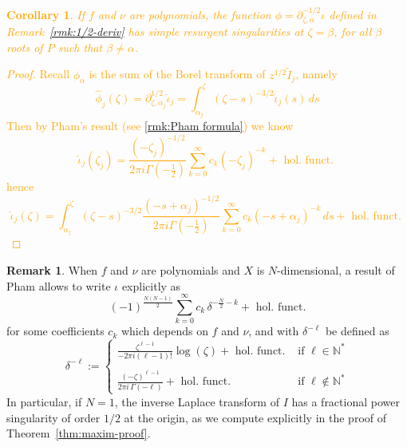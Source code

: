 \documentclass{article}
\newcommand{\fracderiv}[3]{\partial^{#1}_{#2, #3}}
\theoremstyle{definition}
\newtheorem{remark}[definition]{Remark}
\theoremstyle{plain}
\newtheorem{corollary}[theorem]{Corollary}
\begin{document}
\textcolor{orange}{
\begin{corollary}\label{simple-res-thimble}
    If $f$ and $\nu$ are polynomials, the function ${\phi}=\fracderiv{-1/2}{\zeta}{\alpha}\iota$ defined in Remark~\ref{rmk:1/2-deriv} has simple resurgent singularities at $\zeta=\beta$, for all $\beta$ roots of $P$ such that $\beta\neq\alpha$.  
\end{corollary}
\begin{proof}
    Recall ${\phi}_\alpha$ is the sum of the Borel transform of $z^{1/2}\tilde{I}_j$, namely 
    \[\hat{\phi}_j(\zeta)=\fracderiv{1/2}{\zeta}{\alpha_j}\hat{\iota}_j=\int_{\alpha_j}^\zeta(\zeta-s)^{-3/2}\hat{\iota}_j(s)\, ds\]
    Then by Pham's result (see \eqref{rmk:Pham formula}) we know 
    \[\hat{\iota}_j(\zeta_j)=\frac{(-\zeta_j)^{-1/2}}{2\pi i\Gamma(-\tfrac{1}{2})}\sum_{k=0}^\infty c_k (-\zeta_j)^{-k} + \text{ hol. funct. }\]
hence 
\[\hat{\iota}_j(\zeta)=\int_{\alpha_j}^\zeta(\zeta-s)^{-3/2}\frac{(-s+\alpha_j)^{-1/2}}{2\pi i\Gamma(-\tfrac{1}{2})}\sum_{k=0}^\infty c_k (-s+\alpha_j)^{-k} \, ds + \text{ hol. funct. }\]
\end{proof}
}
\begin{remark}\label{rmk:Pham formula}
    When $f$ and $\nu$ are polynomials and $X$ is $N$-dimensional, a result of Pham \cite[Equation 2.4, II partie]{pham} allows to write ${\iota}$ explicitly as 
    \begin{equation}\label{eqn:Pham}
        (-1)^{\frac{N(N-1)}{2}}  \sum_{k=0}^\infty c_k\, \delta^{-\frac{N}{2}-k}+ \text{ hol. funct.}
    \end{equation}
    for some coefficients $c_k$ which depends on $f$ and $\nu$, and with $\delta^{-\ell}$ be defined as
   \begin{equation*}
       \delta^{-\ell}:=\begin{cases}
           \frac{\zeta^{\ell-1}}{-2\pi i(\ell-1)!}\log(\zeta) + \text{ hol. funct.} & \text{ if } \ell\in\mathbb{N}^*\\
           & \\
           \frac{(-\zeta)^{\ell-1}}{2\pi i\, \Gamma(-\ell)}+ \text{ hol. funct.} & \text{ if } \ell\notin \mathbb{N}^* 
       \end{cases}
   \end{equation*}
In particular, if $N=1$, the inverse Laplace transform of $I$ has a fractional power singularity of order $1/2$ at the origin, as we compute explicitly in the proof of Theorem~\ref{thm:maxim-proof}. %
\end{remark}
\end{document}
